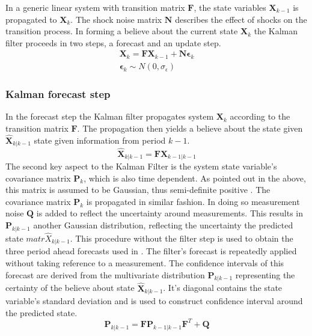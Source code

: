 \documentclass[12pt,a4paper,english]{article} %
\newcommand{\matr}[1]{\mathbf{#1}} %
\begin{document}
	In a generic linear system with transition matrix $\matr{F}$, the state variables $\matr{X}_{k-1}$ is propagated to $\matr{X}_k$. The shock noise matrix $\matr N$ describes the effect of shocks on the transition process. In forming a believe about the current state $\matr{X}_k$ the Kalman filter proceeds in two steps, a forecast and an update step.
	\begin{equation}
		\begin{aligned}
			\matr{X}_k = \matr F \matr{X}_{k-1} + \matr N \matr{\epsilon}_k \\
			\matr{\epsilon}_k \sim N(0, \sigma_{\epsilon})
		\end{aligned}
	\end{equation}
	
	\subsubsection{Kalman forecast step} \label{kalman_forecast_step}
	In the forecast step the Kalman filter propagates system $\matr X_{k}$ according to the transition matrix $\matr F$. The propagation then yields a believe about the state given $\matr{\hat{X}}_{k|k-1}$ state given information from period $k-1$.
	\[
		\matr{\hat{X}}_{k|k-1} = \matr F \matr X_{k-1|k-1}
	\]
	The second key aspect to the Kalman Filter is the system state variable's covariance matrix $\matr P_{k}$, which is also time dependent. As pointed out in the above, this matrix is assumed to be Gaussian, thus semi-definite positive \cite{andrews_kalman_2008}. The covariance matrix $\matr P_{k}$ is propagated in similar fashion. In doing so measurement noise $\matr Q$ is added to reflect the uncertainty around measurements. This results in $\matr{P}_{k| k-1}$ another Gaussian distribution, reflecting the uncertainty the predicted state $matr{\hat{X}}_{k|k-1}$.
	This procedure without the filter step is used to obtain the three period ahead forecasts used in . The filter's forecast is repeatedly applied without taking reference to a measurement. The confidence intervals of this forecast are derived from the multivariate distribution $\matr{P}_{k| k-1}$ representing the certainty of the believe about state $\matr{\hat{X}}_{k|k-1}$. It's diagonal contains the state variable's standard deviation and is used to construct confidence interval around the predicted state. 
	\[
		\matr{P}_{k| k-1} = \matr F \matr{P}_{k-1| k-1} \matr{F}^T + \matr Q
	\]
\end{document}
